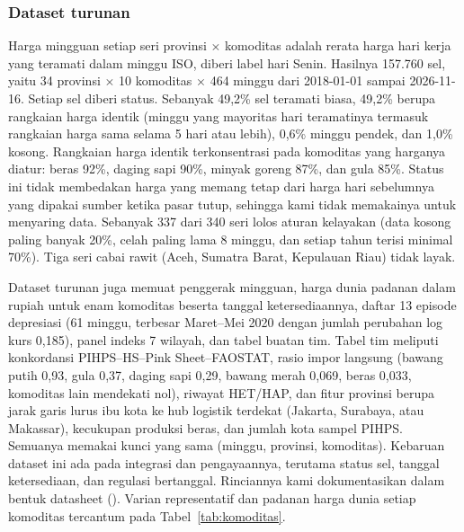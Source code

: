 \documentclass[11pt,a4paper]{article}
\makeatletter
\newcommand{\kg@one}[2]{\ifcsdef{#1@#2}{\csuse{#1@#2}}{\textbf{??#2}\PackageWarning{kagami}{Rujukan tak dikenal: #2}}}
\newcommand{\kg@item}[1]{\kg@sep\kg@one{refp}{#1}\def\kg@sep{; }}
\newcommand{\citep}[1]{\begingroup\def\kg@sep{}(\forcsvlist{\kg@item}{#1})\endgroup}
\makeatother
\begin{document}
\subsubsection{Dataset turunan}
Harga mingguan setiap seri provinsi $\times$ komoditas adalah rerata harga hari kerja yang teramati dalam minggu ISO, diberi label
hari Senin. Hasilnya 157.760 sel, yaitu 34 provinsi $\times$ 10 komoditas $\times$ 464 minggu dari 2018-01-01 sampai 2026-11-16.
Setiap sel diberi status. Sebanyak 49,2\% sel teramati biasa, 49,2\% berupa rangkaian harga identik (minggu yang mayoritas hari
teramatinya termasuk rangkaian harga sama selama 5 hari atau lebih), 0,6\% minggu pendek, dan 1,0\% kosong. Rangkaian harga identik
terkonsentrasi pada komoditas yang harganya diatur: beras 92\%, daging sapi 90\%, minyak goreng 87\%, dan gula 85\%. Status ini
tidak membedakan harga yang memang tetap dari harga hari sebelumnya yang dipakai sumber ketika pasar tutup, sehingga kami tidak
memakainya untuk menyaring data. Sebanyak 337 dari 340 seri lolos aturan kelayakan (data kosong paling banyak 20\%, celah paling
lama 8 minggu, dan setiap tahun terisi minimal 70\%). Tiga seri cabai rawit (Aceh, Sumatra Barat, Kepulauan Riau) tidak layak.

Dataset turunan juga memuat penggerak mingguan, harga dunia padanan dalam rupiah untuk enam komoditas beserta tanggal
ketersediaannya, daftar 13 episode depresiasi (61 minggu, terbesar Maret–Mei 2020 dengan jumlah perubahan log kurs 0,185), panel
indeks 7 wilayah, dan tabel buatan tim. Tabel tim meliputi konkordansi PIHPS–HS–Pink Sheet–FAOSTAT, rasio impor langsung (bawang
putih 0,93, gula 0,37, daging sapi 0,29, bawang merah 0,069, beras 0,033, komoditas lain mendekati nol), riwayat HET/HAP, dan fitur
provinsi berupa jarak garis lurus ibu kota ke hub logistik terdekat (Jakarta, Surabaya, atau Makassar), kecukupan produksi beras,
dan jumlah kota sampel PIHPS. Semuanya memakai kunci yang sama (minggu, provinsi, komoditas). Kebaruan dataset ini ada pada integrasi
dan pengayaannya, terutama status sel, tanggal ketersediaan, dan regulasi bertanggal. Rinciannya kami dokumentasikan dalam bentuk
datasheet \citep{gebru2021}. Varian representatif dan padanan harga dunia setiap komoditas tercantum pada Tabel~\ref{tab:komoditas}.
\end{document}
